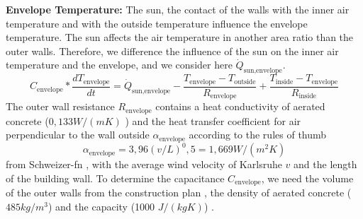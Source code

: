     \textbf{Envelope Temperature:}\newline
    The sun, the contact of the walls with the inner air temperature and with the outside temperature influence the envelope temperature. The sun affects the air temperature in another area ratio than the outer walls. Therefore, we difference the influence of the sun on the inner air temperature and the envelope, and we consider here $\dot{Q}_\text{sun,envelope}$.  
    \begin{equation}
        C_\text{envelope}*\frac{d T_\text{envelope}}{d t} = \dot{Q}_\text{sun,envelope} - \frac{T_\text{envelope}-T_\text{outside}}{R_\text{envelope}} + \frac{T_\text{inside}-T_\text{envelope}}{R_\text{inside}}
    \end{equation}
    The outer wall resistance $R_\text{envelope}$ contains a heat conductivity of aerated concrete ($0,133 W/(m K)$ \cite{GhaziWakili.2015}) and the heat transfer coefficient for air perpendicular to the wall outside $\alpha_\text{envelope}$ according to the rules of thumb 
    \begin{equation}
        \alpha_\text{envelope} = 3,96 (v / L)^0,5 = 1,669 W/(m^2 K)
    \end{equation} from Schweizer-fn \cite{Schweizer-fnalpha}, with the average wind velocity of Karlsruhe $v$ \cite{AbteilungKlimaundUmweltberatung.2004} and the length of the building wall.
    To determine the capacitance $C_\text{envelope}$, we need the volume of the outer walls from the construction plan \cite{Bauplan}, the density of aerated concrete ($485 kg/m^3$) and the capacity (1000 $J/(kg K)$) \cite{GhaziWakili.2015}.\newline  
   
